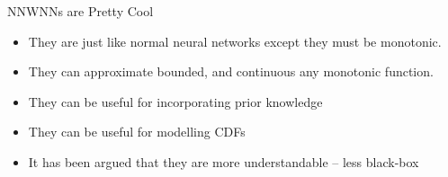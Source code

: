 \documentclass[dvipsnames,handout, notes]{beamer}
\begin{document}
\begin{frame}{NNWNNs are Pretty Cool}
	\begin{itemize}
		\item They are just like normal neural networks except they must be monotonic.
		\item They can approximate bounded, and continuous any monotonic function.
		\item They can be useful for incorporating prior knowledge
		\item They can be useful for modelling CDFs
		\item It has been argued that they are more understandable -- less black-box

	\end{itemize}
\end{frame}
\end{document}
